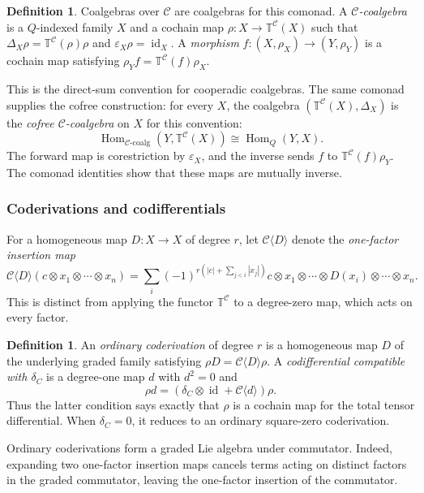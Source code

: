 \documentclass[11pt,letterpaper]{article}
\numberwithin{equation}{section}
\theoremstyle{plain}
\theoremstyle{definition}
\newtheorem{defn}[thm]{Definition}
\theoremstyle{remark}
\newcommand{\Hom}{\operatorname{Hom}}
\newcommand{\id}{\operatorname{id}}
\begin{document}
\begin{defn}\label{defn:coalgebra_over_E_cooperad}
	Coalgebras over $\mathscr C$ are coalgebras for this comonad.
A \textit{$\mathscr C$-coalgebra} is a $Q$-indexed family $X$ and a
cochain map $\rho:X\to\mathbb T^{\mathscr C}(X)$ such that
$
 \Delta_X\rho=\mathbb T^{\mathscr C}(\rho)\rho$ and $ \varepsilon_X\rho=\id_X$.
A \textit{morphism} $f:(X,\rho_X)\to(Y,\rho_Y)$ is a cochain map satisfying
$\rho_Yf=\mathbb T^{\mathscr C}(f)\rho_X$.
\end{defn}
This is the direct-sum convention for cooperadic coalgebras.
The same comonad supplies the cofree construction: for every $X$, the coalgebra
$(\mathbb T^{\mathscr C}(X),\Delta_X)$ is the \textit{cofree $\mathscr C$-coalgebra} on $X$ for this convention:
\[
 \operatorname{Hom}_{\mathscr C\text{-coalg}}
   (Y,\mathbb T^{\mathscr C}(X))\cong\Hom_Q(Y,X).
\]
The forward map is corestriction by $\varepsilon_X$, and the inverse
sends $f$ to $\mathbb T^{\mathscr C}(f)\rho_Y$.
The comonad identities show that these maps are mutually inverse.

\subsubsection{Coderivations and codifferentials}
\label{sss_coderivation_codifferential}
For a homogeneous map $D:X\to X$ of degree $r$, let
$\mathscr C\langle D\rangle$ denote the \textit{one-factor insertion map}
\[
 \mathscr C\langle D\rangle(c\otimes x_1\otimes\cdots\otimes x_n)
 =\sum_i(-1)^{r(|c|+\sum_{j<i}|x_j|)}
 c\otimes x_1\otimes\cdots\otimes D(x_i)\otimes\cdots\otimes x_n.
\]
This is distinct from applying the functor $\mathbb T^{\mathscr C}$
to a degree-zero map, which acts on every factor.
\begin{defn}\label{defn:C_coderivation}
An \textit{ordinary coderivation} of degree $r$ is a homogeneous map
$D$ of the underlying graded family satisfying
$\rho D=\mathscr C\langle D\rangle\rho$.
A \textit{codifferential compatible with $\delta_C$} is a degree-one
map $d$ with $d^2=0$ and
\[
 \rho d=(\delta_C\otimes\id+\mathscr C\langle d\rangle)\rho.
\]
Thus the latter condition says exactly that $\rho$ is a cochain map
for the total tensor differential. When $\delta_C=0$, it reduces to
an ordinary square-zero coderivation.
\end{defn}
Ordinary coderivations form a graded Lie algebra under commutator.
Indeed, expanding two one-factor insertion maps cancels terms acting
on distinct factors in the graded commutator, leaving the one-factor
insertion of the commutator.
\end{document}

